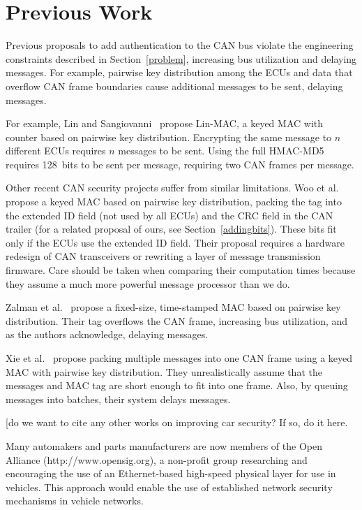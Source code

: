 \section{Previous Work}
\label{previous}

Previous proposals to add authentication to the CAN bus violate the engineering constraints described
in Section~\ref{problem}, increasing bus utilization and delaying messages.  For example, pairwise
key distribution among the ECUs and data that overflow CAN frame boundaries cause additional messages to be sent,
delaying messages.

For example, Lin and Sangiovanni~\cite{Lin-MAC} propose Lin-MAC, a keyed MAC with counter based on
pairwise key distribution.  Encrypting the same message to $n$ different ECUs requires $n$
messages to be sent.   Using the full HMAC-MD5 requires 128~bits to be sent per message, requiring two CAN frames per message.

Other recent CAN security projects suffer from similar limitations. 
Woo et al.~\cite{Woo-14} propose a keyed MAC based on pairwise key distribution,
packing the tag into the extended ID field (not used by all ECUs) and the CRC field in the CAN trailer
(for a related proposal of ours, see Section~\ref{addingbits}). 
These bits fit only if the ECUs use the extended ID field. 
Their proposal requires a hardware redesign of CAN transceivers or rewriting a layer of message transmission firmware.
Care should be taken when comparing their computation times because
they assume a much more powerful message processor than we do. 


Zalman et al.~\cite{Zalman-14} propose a fixed-size, time-stamped MAC based on pairwise key distribution.
Their tag overflows the CAN frame, increasing bus utilization, and as the authors acknowledge,
delaying messages.

Xie et al.~\cite{Xie-15} propose packing multiple messages into one CAN frame using a keyed MAC with 
pairwise key distribution.   They unrealistically assume that the messages and MAC tag are short
enough to fit into one frame.  Also, by queuing messages into batches, their system delays messages.

[do we want to cite any other works on improving car security? If so, do it here.%

Many automakers and parts manufacturers are now members of the Open Alliance (http://www.opensig.org), 
a non-profit group researching and encouraging the use of an Ethernet-based high-speed physical layer 
for use in vehicles.  This approach would enable the use of 
established network security mechanisms in vehicle networks.

